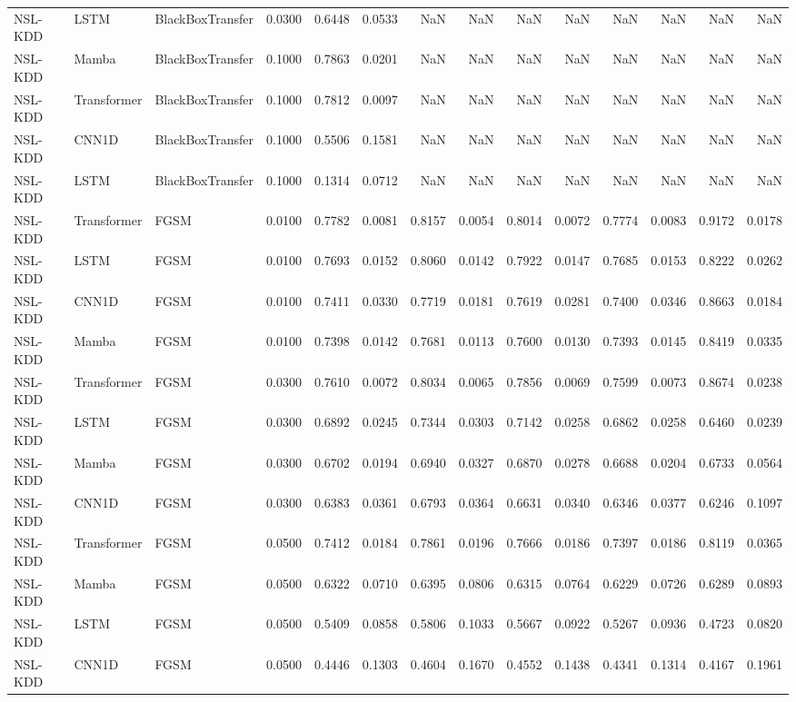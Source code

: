\begin{table}[ht]
\begin{tabular}{lllrrrrrrrrrrr}
NSL-KDD & LSTM & BlackBoxTransfer & 0.0300 & 0.6448 & 0.0533 & NaN & NaN & NaN & NaN & NaN & NaN & NaN & NaN \\
NSL-KDD & Mamba & BlackBoxTransfer & 0.1000 & 0.7863 & 0.0201 & NaN & NaN & NaN & NaN & NaN & NaN & NaN & NaN \\
NSL-KDD & Transformer & BlackBoxTransfer & 0.1000 & 0.7812 & 0.0097 & NaN & NaN & NaN & NaN & NaN & NaN & NaN & NaN \\
NSL-KDD & CNN1D & BlackBoxTransfer & 0.1000 & 0.5506 & 0.1581 & NaN & NaN & NaN & NaN & NaN & NaN & NaN & NaN \\
NSL-KDD & LSTM & BlackBoxTransfer & 0.1000 & 0.1314 & 0.0712 & NaN & NaN & NaN & NaN & NaN & NaN & NaN & NaN \\
NSL-KDD & Transformer & FGSM & 0.0100 & 0.7782 & 0.0081 & 0.8157 & 0.0054 & 0.8014 & 0.0072 & 0.7774 & 0.0083 & 0.9172 & 0.0178 \\
NSL-KDD & LSTM & FGSM & 0.0100 & 0.7693 & 0.0152 & 0.8060 & 0.0142 & 0.7922 & 0.0147 & 0.7685 & 0.0153 & 0.8222 & 0.0262 \\
NSL-KDD & CNN1D & FGSM & 0.0100 & 0.7411 & 0.0330 & 0.7719 & 0.0181 & 0.7619 & 0.0281 & 0.7400 & 0.0346 & 0.8663 & 0.0184 \\
NSL-KDD & Mamba & FGSM & 0.0100 & 0.7398 & 0.0142 & 0.7681 & 0.0113 & 0.7600 & 0.0130 & 0.7393 & 0.0145 & 0.8419 & 0.0335 \\
NSL-KDD & Transformer & FGSM & 0.0300 & 0.7610 & 0.0072 & 0.8034 & 0.0065 & 0.7856 & 0.0069 & 0.7599 & 0.0073 & 0.8674 & 0.0238 \\
NSL-KDD & LSTM & FGSM & 0.0300 & 0.6892 & 0.0245 & 0.7344 & 0.0303 & 0.7142 & 0.0258 & 0.6862 & 0.0258 & 0.6460 & 0.0239 \\
NSL-KDD & Mamba & FGSM & 0.0300 & 0.6702 & 0.0194 & 0.6940 & 0.0327 & 0.6870 & 0.0278 & 0.6688 & 0.0204 & 0.6733 & 0.0564 \\
NSL-KDD & CNN1D & FGSM & 0.0300 & 0.6383 & 0.0361 & 0.6793 & 0.0364 & 0.6631 & 0.0340 & 0.6346 & 0.0377 & 0.6246 & 0.1097 \\
NSL-KDD & Transformer & FGSM & 0.0500 & 0.7412 & 0.0184 & 0.7861 & 0.0196 & 0.7666 & 0.0186 & 0.7397 & 0.0186 & 0.8119 & 0.0365 \\
NSL-KDD & Mamba & FGSM & 0.0500 & 0.6322 & 0.0710 & 0.6395 & 0.0806 & 0.6315 & 0.0764 & 0.6229 & 0.0726 & 0.6289 & 0.0893 \\
NSL-KDD & LSTM & FGSM & 0.0500 & 0.5409 & 0.0858 & 0.5806 & 0.1033 & 0.5667 & 0.0922 & 0.5267 & 0.0936 & 0.4723 & 0.0820 \\
NSL-KDD & CNN1D & FGSM & 0.0500 & 0.4446 & 0.1303 & 0.4604 & 0.1670 & 0.4552 & 0.1438 & 0.4341 & 0.1314 & 0.4167 & 0.1961 \\

\end{tabular}
\end{table}

